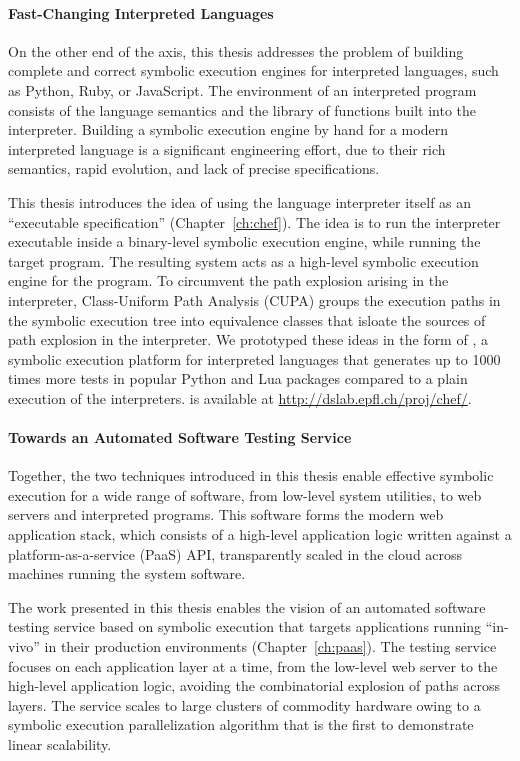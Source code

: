 \paragraph{Fast-Changing Interpreted Languages}

On the other end of the axis, this thesis addresses the problem of building complete and correct symbolic execution engines for interpreted languages, such as Python, Ruby, or JavaScript.
%
The environment of an interpreted program consists of the language semantics and the library of functions built into the interpreter.
%
Building a symbolic execution engine by hand for a modern interpreted language is a significant engineering effort, due to their rich semantics, rapid evolution, and lack of precise specifications.

This thesis introduces the idea of using the language interpreter itself as an ``executable specification'' (Chapter~\ref{ch:chef}).
%
The idea is to run the interpreter executable inside a binary-level symbolic execution engine, while running the target program.  The resulting system acts as a high-level symbolic execution engine for the program.
%
To circumvent the path explosion arising in the interpreter, Class-Uniform Path Analysis (CUPA) groups the execution paths in the symbolic execution tree into equivalence classes that isloate the sources of path explosion in the interpreter.
%
We prototyped these ideas in the form of \chef, a symbolic execution platform for interpreted languages that generates up to 1000 times more tests in popular Python and Lua packages compared to a plain execution of the interpreters.
%
\chef is available at {\url{http://dslab.epfl.ch/proj/chef/}}.


\paragraph{Towards an Automated Software Testing Service}

Together, the two techniques introduced in this thesis enable effective symbolic execution for a wide range of software, from low-level system utilities, to web servers and interpreted programs.
%
This software forms the modern web application stack, which consists of a high-level application logic written against a platform-as-a-service (PaaS) API, transparently scaled in the cloud across machines running the system software.

The work presented in this thesis enables the vision of an automated software testing service based on symbolic execution that targets applications running ``in-vivo'' in their production environments (Chapter~\ref{ch:paas}).
%
The testing service focuses on each application layer at a time, from the low-level web server to the high-level application logic, avoiding the combinatorial explosion of paths across layers.
%
The service scales to large clusters of commodity hardware owing to a symbolic execution parallelization algorithm that is the first to demonstrate linear scalability.

